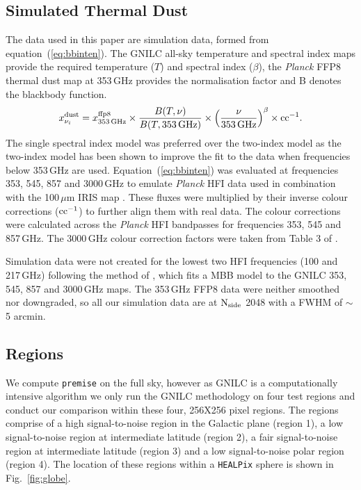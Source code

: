 \documentclass[a4paper,fleqn,usenatbib]{mnras}
\begin{document}
\subsection{Simulated Thermal Dust}
The data used in this paper are simulation data, formed from equation~(\ref{eq:bbinten}).
The GNILC \footnotemark  all-sky temperature and spectral index maps provide the required temperature ($T$)
 and spectral index ($\beta$), the {\it{Planck}} FFP8 \citep{ffp} thermal dust map at 353\,GHz provides the normalisation factor and B denotes the blackbody function.  
\begin{eqnarray}
x_{\nu_{i}} ^{\rm{dust}} = x_{353\, \rm{GHz}}^{\rm{ffp8}} \times \frac{B(T,  \nu)}{B(T, 353 \, \rm{GHz})} \times
    \left(\frac{\nu}{353 \, \rm{GHz}}\right)^{\beta} \times \rm{cc}^{-1}.
\label{eq:bbinten}
\end{eqnarray}
The single spectral index model was preferred over the two-index model \citep{meis} as the two-index model has been shown to improve the fit to the data when frequencies below 353\,GHz are used. Equation~(\ref{eq:bbinten}) was evaluated at frequencies 353, 545, 857 and 3000\,GHz to emulate {\it{Planck}} HFI data used in combination with the 100\,$\mu$m IRIS map \citep{iris}. These fluxes were multiplied by their inverse colour corrections ($\rm{cc}^{-1}$) to further align them with real data. The colour corrections were calculated across the {\it{Planck}} HFI bandpasses for frequencies 353, 545 and 857\,GHz. The 3000\,GHz colour correction factors were taken from Table 3 of \citet{iris}. 

Simulation data were not created for the lowest two HFI frequencies (100 and 217\,GHz) following the method of \citep{gnilc}, which fits a MBB model to the GNILC 353, 545, 857 and 3000\,GHz maps. The 353\,GHz FFP8 data were neither smoothed nor downgraded, so all our simulation data are at $\rm{N_{side}}$ 2048 with a FWHM of $\sim$ 5 arcmin. 

\subsection{Regions}

We compute {\texttt{premise}} on the full sky, however as GNILC is a computationally intensive algorithm we only run the GNILC methodology on four test regions and conduct our comparison within these four, 256X256 pixel regions. The regions comprise of a high signal-to-noise region in the Galactic plane (region 1), a low signal-to-noise region at intermediate latitude (region 2), a fair signal-to-noise region at intermediate latitude (region 3) and a low signal-to-noise polar region (region 4). The location of these regions within a {\texttt{HEALPix}} sphere is shown in Fig.~\ref{fig:globe}. 
\end{document}
